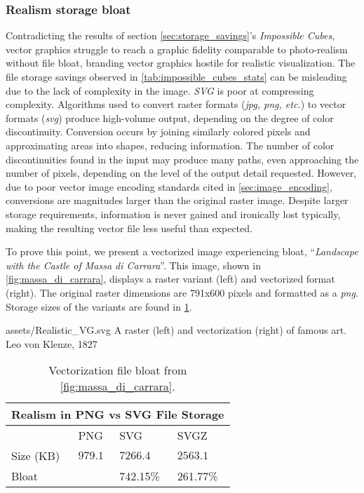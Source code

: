 \subsubsection{Realism storage bloat}
Contradicting the results of section \cref{sec:storage_savings}'s \textit{Impossible Cubes}, vector graphics struggle to reach a graphic fidelity comparable to photo-realism without file bloat, branding vector graphics hostile for realistic visualization. The file storage savings observed in \cref{tab:impossible_cubes_stats} can be misleading due to the lack of complexity in the image. \textit{SVG} is poor at compressing complexity. Algorithms used to convert raster formats (\textit{jpg, png, etc.}) to vector formats (\textit{svg}) produce high-volume output, depending on the degree of color discontinuity. Conversion occurs by joining similarly colored pixels and approximating areas into shapes, reducing information. The number of color discontinuities found in the input may produce many paths, even approaching the number of pixels, depending on the level of the output detail requested. However, due to poor vector image encoding standards  cited in \cref{sec:image_encoding}, conversions are magnitudes larger than the original raster image. Despite larger storage requirements, information is never gained and ironically lost typically, making the resulting vector file less useful than expected.\medskip

To prove this point, we present a vectorized image experiencing bloat, ``\textit{Landscape with the Castle of Massa di Carrara}''. This image, shown in \cref{fig:massa_di_carrara}, displays a raster variant (left) and vectorized format (right). The original raster dimensions are 791x600 pixels and formatted as a \textit{png}. Storage sizes of the variants are found in \cref{tab:massa_di_carrara}.\medskip

\widesvg
{assets/Realistic_VG.svg}
{\label{fig:massa_di_carrara}A raster (left) and vectorization (right) of famous art.}
{Leo von Klenze, 1827}\medskip

\begin{table}[H]
\centering
\begin{tabular}{ |p{2cm}||p{2cm}|p{2cm}|p{2cm}| }
\hline
\multicolumn{4}{|c|}{Realism in PNG vs SVG File Storage}\\
\hline
&PNG&SVG&SVGZ\\
\hline
Size (KB)&$979.1$&$7266.4$&$2563.1$\\
\hline
Bloat&&742.15\%&261.77\%\\
\hline
\end{tabular}
\caption{\label{tab:massa_di_carrara}Vectorization file bloat from \cref{fig:massa_di_carrara}.}
\end{table}

